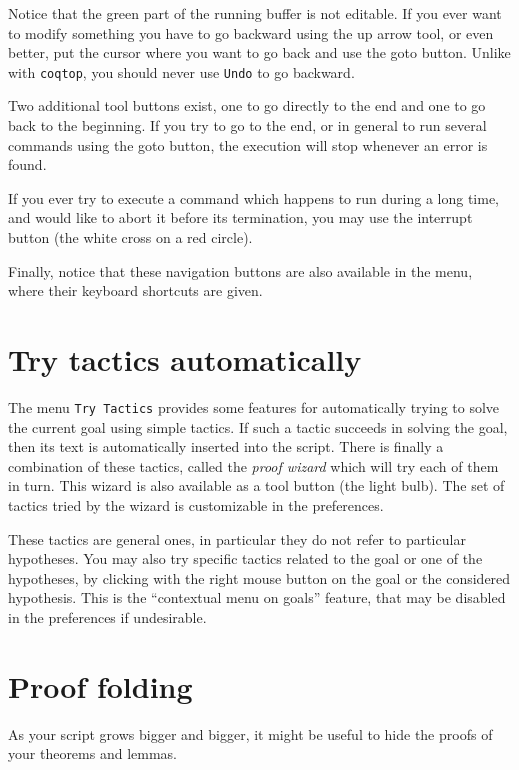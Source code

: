 Notice that the green part of the running buffer is not editable. If
you ever want to modify something you have to go backward using the up
arrow tool, or even better, put the cursor where you want to go back
and use the \textsf{goto} button. Unlike with \verb|coqtop|, you
should never use \verb|Undo| to go backward.

Two additional tool buttons exist, one to go directly to the end and
one to go back to the beginning. If you try to go to the end, or in
general to run several commands using the \textsf{goto} button, the
  execution will stop whenever an error is found.

If you ever try to execute a command which happens to run during a
long time, and would like to abort it before its
termination, you may use the interrupt button (the white cross on a red circle).
 
Finally, notice that these navigation buttons are also available in
the menu, where their keyboard shortcuts are given.

\section[Try tactics automatically]{Try tactics automatically\label{sec:trytactics}}

The menu \texttt{Try Tactics} provides some features for automatically
trying to solve the current goal using simple tactics. If such a
tactic succeeds in solving the goal, then its text is automatically
inserted into the script. There is finally a combination of these
tactics, called the \emph{proof wizard} which will try each of them in
turn. This wizard is also available as a tool button (the light
bulb).  The set of tactics tried by the wizard is customizable in
the preferences.

These tactics are general ones, in particular they do not refer to
particular hypotheses. You may also try specific tactics related to
the goal or one of the hypotheses, by clicking with the right mouse
button on the goal or the considered hypothesis. This is the
``contextual menu on goals'' feature, that may be disabled in the
preferences if undesirable.

\section{Proof folding}

As your script grows bigger and bigger, it might be useful to hide the proofs
of your theorems and lemmas.


